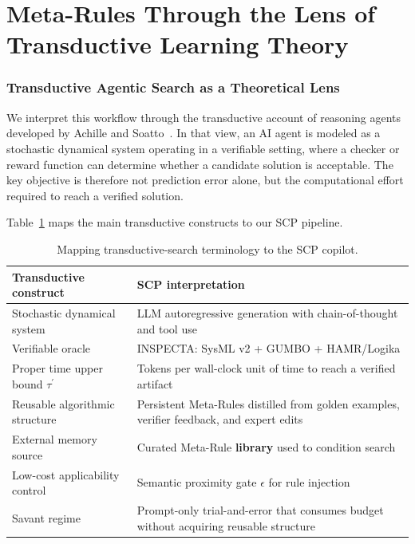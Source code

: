 \documentclass[conference]{IEEEtran}
\begin{document}
\begin{figure}[h]
{}
\label{fig:vsc}
\end{figure}

\section{Meta-Rules Through the Lens of Transductive Learning Theory}
\label{app:transductive}
\subsubsection{Transductive Agentic Search as a Theoretical Lens}

We interpret this workflow through the transductive account of reasoning agents developed by Achille and Soatto~\cite{e28030332}. In that view, an AI agent is modeled as a stochastic dynamical system operating in a verifiable setting, where a checker or reward function can determine whether a candidate solution is acceptable. The key objective is therefore not prediction error alone, but the computational effort required to reach a verified solution.

Table~\ref{tab:transductive-map} maps the main transductive constructs to our SCP pipeline.

\begin{table}[t]
\caption{Mapping transductive-search terminology to the SCP copilot.}
\label{tab:transductive-map}
\centering
\footnotesize
\begin{tabular}{p{3.0cm} p{4.6cm}}
\hline
\textbf{Transductive construct} & \textbf{SCP interpretation} \\
\hline
Stochastic dynamical system & LLM autoregressive generation with chain-of-thought and tool use \\
Verifiable oracle & INSPECTA: SysML v2 + GUMBO + HAMR/Logika \\
Proper time upper bound $\tau^{'}$ & Tokens per wall-clock unit of time to reach a verified artifact \\
Reusable algorithmic structure & Persistent Meta-Rules distilled from golden examples, verifier feedback, and expert edits \\
External memory source & Curated Meta-Rule \textbf{library} used to condition search \\
Low-cost applicability control & Semantic proximity gate $\epsilon$ for rule injection \\
Savant regime & Prompt-only trial-and-error that consumes budget without acquiring reusable structure \\
\hline
\end{tabular}
\end{table}
\end{document}
